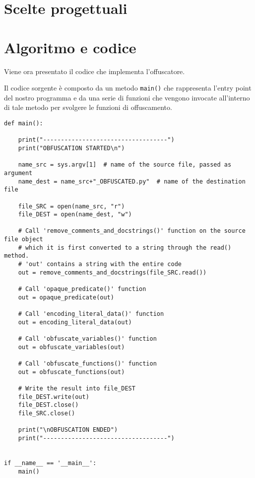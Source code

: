 \documentclass[a4paper,oneside,openright,titlepage,10pt,footinclude,headinclude]{scrbook}
\begin{document}
\section{Scelte progettuali}\label{offuscatore_scelte}

\section{Algoritmo e codice}\label{offuscatore_algo}
Viene ora presentato il codice che implementa l'offuscatore.\medskip

Il codice sorgente è composto da  un metodo \texttt{main()} che rappresenta l'entry point del nostro programma e da una serie di funzioni  che vengono invocate all'interno di tale metodo per svolgere le funzioni di offuscamento.
\begin{graybox}[innerleftmargin=2,]
\begin{lstlisting}
def main():

    print("-----------------------------------")
    print("OBFUSCATION STARTED\n")

    name_src = sys.argv[1]  # name of the source file, passed as argument
    name_dest = name_src+"_OBFUSCATED.py"  # name of the destination file

    file_SRC = open(name_src, "r")
    file_DEST = open(name_dest, "w")

    # Call 'remove_comments_and_docstrings()' function on the source file object
    # which it is first converted to a string through the read() method.
    # 'out' contains a string with the entire code
    out = remove_comments_and_docstrings(file_SRC.read())   

    # Call 'opaque_predicate()' function
    out = opaque_predicate(out)

    # Call 'encoding_literal_data()' function
    out = encoding_literal_data(out)

    # Call 'obfuscate_variables()' function
    out = obfuscate_variables(out)
    
    # Call 'obfuscate_functions()' function
    out = obfuscate_functions(out)

    # Write the result into file_DEST
    file_DEST.write(out)
    file_DEST.close()
    file_SRC.close()

    print("\nOBFUSCATION ENDED")
    print("-----------------------------------")


if __name__ == '__main__':
    main()
\end{lstlisting}
\end{graybox}
\end{document}
